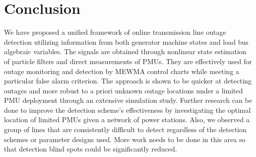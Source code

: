 \section{Conclusion}
\label{sec:conclusion}
We have proposed a unified framework of online transmission line outage detection utilizing information from both generator machine states and load bus algebraic variables. The signals are obtained through nonlinear state estimation of particle filters and direct measurements of PMUs. They are effectively used for outage monitoring and detection by MEWMA control charts while meeting a particular false alarm criterion. The approach is shown to be quicker at detecting outages and more robust to a priori unknown outage locations under a limited PMU deployment through an extensive simulation study. Further research can be done to improve the detection scheme's effectiveness by investigating the optimal location of limited PMUs given a network of power stations. Also, we observed a group of lines that are consistently difficult to detect regardless of the detection schemes or parameter designs used. More work needs to be done in this area so that detection blind spots could be significantly reduced. 








